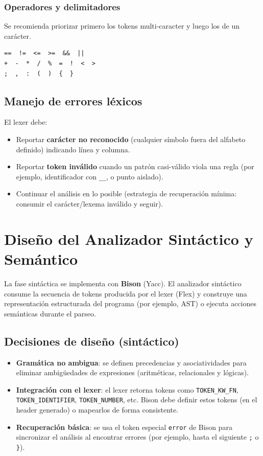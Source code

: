 \documentclass[12pt]{article}
\begin{document}
\subsubsection*{Operadores y delimitadores}
Se recomienda priorizar primero los tokens multi-caracter y luego los de un carácter.
\begin{verbatim}
==  !=  <=  >=  &&  ||
+  -  *  /  %  =  !  <  >
;  ,  :  (  )  {  }
\end{verbatim}

\subsection{Manejo de errores léxicos}
El lexer debe:
\begin{itemize}[nosep]
  \item Reportar \textbf{carácter no reconocido} (cualquier símbolo fuera del alfabeto definido) indicando línea y columna.
  \item Reportar \textbf{token inválido} cuando un patrón casi-válido viola una regla (por ejemplo, identificador con \texttt{__}, o punto aislado).
  \item Continuar el análisis en lo posible (estrategia de recuperación mínima: consumir el carácter/lexema inválido y seguir).
\end{itemize}

\section{Diseño del Analizador Sintáctico y Semántico}
La fase sintáctica se implementa con \textbf{Bison} (Yacc). El analizador sintáctico consume la secuencia de tokens producida por el lexer (Flex) y construye una representación estructurada del programa (por ejemplo, AST) o ejecuta acciones semánticas durante el parseo.

\subsection{Decisiones de diseño (sintáctico)}
\begin{itemize}[nosep]
  \item \textbf{Gramática no ambigua}: se definen precedencias y asociatividades para eliminar ambigüedades de expresiones (aritméticas, relacionales y lógicas).
  \item \textbf{Integración con el lexer}: el lexer retorna tokens como \texttt{TOKEN\_KW\_FN}, \texttt{TOKEN\_IDENTIFIER}, \texttt{TOKEN\_NUMBER}, etc. Bison debe definir estos tokens (en el header generado) o mapearlos de forma consistente.
  \item \textbf{Recuperación básica}: se usa el token especial \texttt{error} de Bison para sincronizar el análisis al encontrar errores (por ejemplo, hasta el siguiente \texttt{;} o \texttt{\}}).
\end{itemize}
\end{document}
